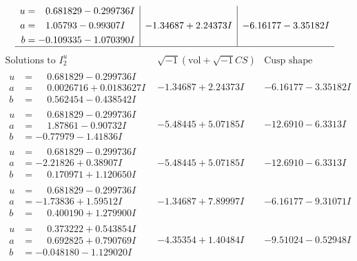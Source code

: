 \documentclass[1p]{elsarticle_modified}
\theoremstyle{definition}
\newcommand{\I}{\sqrt{-1}}
\begin{document}
$$\begin{array}{c|c|c}
\begin{aligned}
u &= \phantom{-}0.681829 - 0.299736 I \\
a &= \phantom{-}1.05793 - 0.99307 I \\
b &= -0.109335 - 1.070390 I\end{aligned}
 & -1.34687 + 2.24373 I & -6.16177 - 3.35182 I\\
 \hline 
 \end{array}$$\newpage$$\begin{array}{c|c|c}  
\text{Solutions to }I^u_{2}& \I (\text{vol} + \sqrt{-1}CS) & \text{Cusp shape}\\
 \hline 
\begin{aligned}
u &= \phantom{-}0.681829 - 0.299736 I \\
a &= \phantom{-}0.0026716 + 0.0183627 I \\
b &= \phantom{-}0.562454 - 0.438542 I\end{aligned}
 & -1.34687 + 2.24373 I & -6.16177 - 3.35182 I \\ \hline\begin{aligned}
u &= \phantom{-}0.681829 - 0.299736 I \\
a &= \phantom{-}1.87861 - 0.90732 I \\
b &= -0.77979 - 1.41836 I\end{aligned}
 & -5.48445 + 5.07185 I & -12.6910 - 6.3313 I \\ \hline\begin{aligned}
u &= \phantom{-}0.681829 - 0.299736 I \\
a &= -2.21826 + 0.38907 I \\
b &= \phantom{-}0.170971 + 1.120650 I\end{aligned}
 & -5.48445 + 5.07185 I & -12.6910 - 6.3313 I \\ \hline\begin{aligned}
u &= \phantom{-}0.681829 - 0.299736 I \\
a &= -1.73836 + 1.59512 I \\
b &= \phantom{-}0.400190 + 1.279900 I\end{aligned}
 & -1.34687 + 7.89997 I & -6.16177 - 9.31071 I \\ \hline\begin{aligned}
u &= \phantom{-}0.373222 + 0.543854 I \\
a &= \phantom{-}0.692825 + 0.790769 I \\
b &= -0.048180 - 1.129020 I\end{aligned}
 & -4.35354 + 1.40484 I & -9.51024 - 0.52948 I \\ \hline\begin{aligned}

\end{aligned}
\end{array}$$
\end{document}
